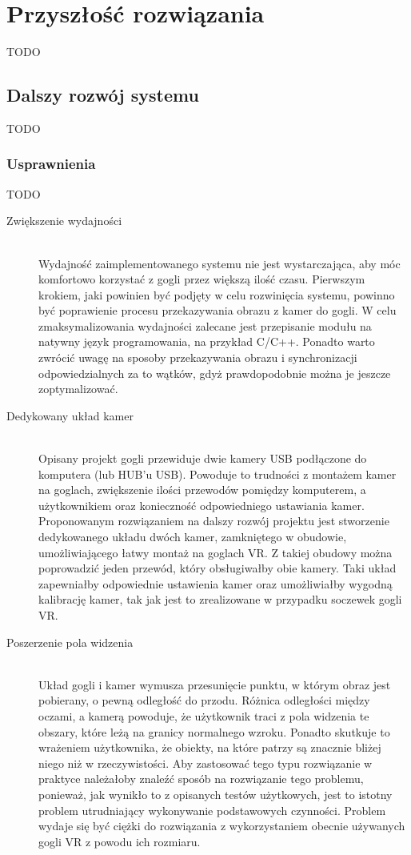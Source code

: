 \documentclass[a4paper,11pt,twoside]{report}
\theoremstyle{definition}
\begin{document}
\chapter{Przyszłość rozwiązania}
TODO

\section{Dalszy rozwój systemu}
TODO

\subsection{Usprawnienia}
TODO
\begin{description}
\item [Zwiększenie wydajności] \hfill \\
Wydajność zaimplementowanego systemu nie jest wystarczająca, aby móc komfortowo korzystać z gogli przez większą ilość czasu. Pierwszym krokiem, jaki powinien być podjęty w celu rozwinięcia systemu, powinno być poprawienie procesu przekazywania obrazu z kamer do gogli. W celu zmaksymalizowania wydajności zalecane jest przepisanie modułu na natywny język programowania, na przykład C/C++. Ponadto warto zwrócić uwagę na sposoby przekazywania obrazu i synchronizacji odpowiedzialnych za to wątków, gdyż prawdopodobnie można je jeszcze zoptymalizować.

\item [Dedykowany układ kamer] \hfill \\
Opisany projekt gogli przewiduje dwie kamery USB podłączone do komputera (lub HUB'u USB). Powoduje to trudności z montażem kamer na goglach, zwiększenie ilości przewodów pomiędzy komputerem, a użytkownikiem oraz konieczność odpowiedniego ustawiania kamer. Proponowanym rozwiązaniem na dalszy rozwój projektu jest stworzenie dedykowanego układu dwóch kamer, zamkniętego w obudowie, umożliwiającego łatwy montaż na goglach VR. Z takiej obudowy można poprowadzić jeden przewód, który obsługiwałby obie kamery. Taki układ zapewniałby odpowiednie ustawienia kamer oraz umożliwiałby wygodną kalibrację kamer, tak jak jest to zrealizowane w przypadku soczewek gogli VR.

\item [Poszerzenie pola widzenia] \hfill \\
Układ gogli i kamer wymusza przesunięcie punktu, w którym obraz jest pobierany, o pewną odległość do przodu. Różnica odległości między oczami, a kamerą powoduje, że użytkownik traci z pola widzenia te obszary, które leżą na granicy normalnego wzroku. Ponadto skutkuje to wrażeniem użytkownika, że obiekty, na które patrzy są znacznie bliżej niego niż w rzeczywistości. Aby zastosować tego typu rozwiązanie w praktyce należałoby znaleźć sposób na rozwiązanie tego problemu, ponieważ, jak wynikło to z opisanych testów użytkowych, jest to istotny problem utrudniający wykonywanie podstawowych czynności. Problem wydaje się być ciężki do rozwiązania z wykorzystaniem obecnie używanych gogli VR z powodu ich rozmiaru.
\end{description}
\end{document}
